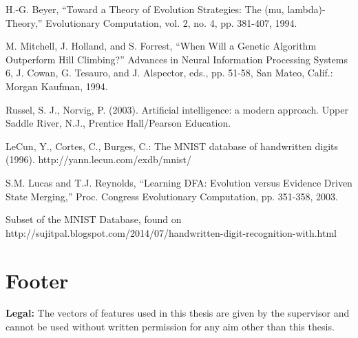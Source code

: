 \documentclass{mini}
\begin{document}
\begin{thebibliography}{1}
     H.-G. Beyer, “Toward a Theory of Evolution Strategies: The (mu, lambda)-Theory,” Evolutionary Computation, vol. 2, no. 4, pp. 381-407, 1994.
    
     M. Mitchell, J. Holland, and S. Forrest, “When Will a Genetic Algorithm Outperform Hill Climbing?” Advances in Neural Information Processing Systems 6, J. Cowan, G. Tesauro, and J. Alspector,
    eds., pp. 51-58, San Mateo, Calif.: Morgan Kaufman, 1994.
    
     Russel, S. J., Norvig, P. (2003). Artificial intelligence: a modern approach. Upper Saddle River, N.J., Prentice Hall/Pearson Education.
    
    LeCun, Y., Cortes, C., Burges, C.: The MNIST database of handwritten digits (1996). http://yann.lecun.com/exdb/mnist/
    
    S.M. Lucas and T.J. Reynolds, “Learning DFA: Evolution versus Evidence Driven State Merging,” Proc. Congress Evolutionary Computation, pp. 351-358, 2003.
    
     Subset of the MNIST Database, found on http://sujitpal.blogspot.com/2014/07/handwritten-digit-recognition-with.html

\end{thebibliography}



\newpage
\chapter*{Footer}
{\bf Legal:} The vectors of features used in this thesis are given by the supervisor and cannot be used without written permission for any aim other than this thesis.
\newpage


\makestatement
\end{document}
